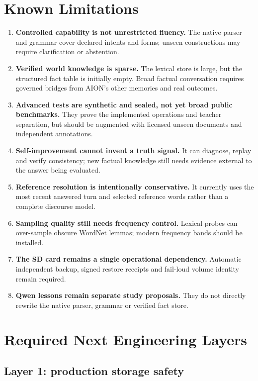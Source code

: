 \documentclass[11pt,a4paper]{article}
\begin{document}
\section{Known Limitations}

\begin{enumerate}
  \item \textbf{Controlled capability is not unrestricted fluency.} The native parser and
        grammar cover declared intents and forms; unseen constructions may require
        clarification or abstention.
  \item \textbf{Verified world knowledge is sparse.} The lexical store is large, but the
        structured fact table is initially empty. Broad factual conversation requires
        governed bridges from AION's other memories and real outcomes.
  \item \textbf{Advanced tests are synthetic and sealed, not yet broad public benchmarks.}
        They prove the implemented operations and teacher separation, but should be augmented
        with licensed unseen documents and independent annotations.
  \item \textbf{Self-improvement cannot invent a truth signal.} It can diagnose, replay and
        verify consistency; new factual knowledge still needs evidence external to the answer
        being evaluated.
  \item \textbf{Reference resolution is intentionally conservative.} It currently uses the
        most recent answered turn and selected reference words rather than a complete discourse
        model.
  \item \textbf{Sampling quality still needs frequency control.} Lexical probes can over-sample
        obscure WordNet lemmas; modern frequency bands should be installed.
  \item \textbf{The SD card remains a single operational dependency.} Automatic independent
        backup, signed restore receipts and fail-loud volume identity remain required.
  \item \textbf{Qwen lessons remain separate study proposals.} They do not directly rewrite
        the native parser, grammar or verified fact store.
\end{enumerate}

\section{Required Next Engineering Layers}

\subsection{Layer 1: production storage safety}
\end{document}
